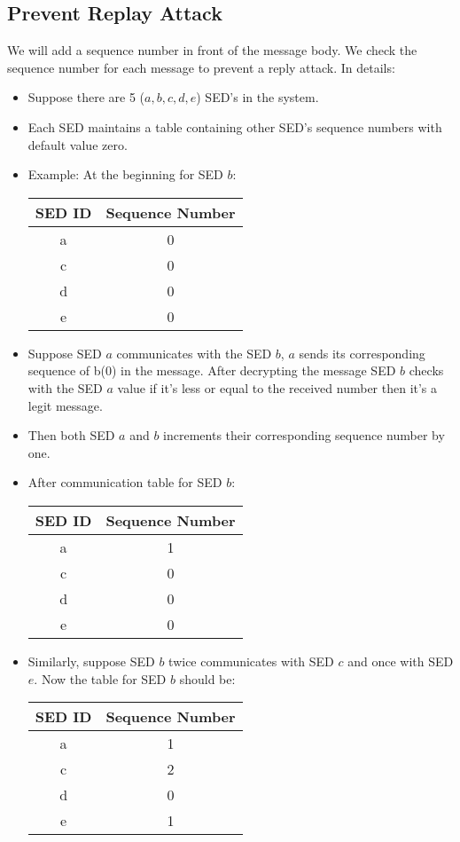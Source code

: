 \documentclass[11pt,oneside,onecolumn,letterpaper]{article}
\begin{document}
  \subsection{Prevent Replay Attack}
  We will add a sequence number in front of the message body. We check the sequence number for each message to prevent a reply attack.
  In details:
  \begin{itemize}
  \item Suppose there are 5 ($a, b, c, d, e$) SED's in the system.
  \item Each SED maintains a table containing other SED's sequence numbers with default value zero.
  \item  Example: At the beginning for SED $b$:

    \begin{center}
  \begin{tabular}{ |c|c| } 
   \hline
  \textbf{SED ID} & \textbf{Sequence Number} \\
 	\hline \hline
 	a & 0 \\ 
	c & 0  \\ 
 	d & 0 \\ 
 	e & 0 \\ 
	 \hline
\end{tabular}
\end{center}
  \item Suppose SED $a$ communicates with the SED $b$, $a$ sends its corresponding sequence of b($0$) in the message. After decrypting the message SED $b$ checks with the SED $a$ value if it's less or equal to the received number then it's a legit message. 
  \item Then both SED $a$ and $b$ increments their corresponding sequence number by one.
  \item After communication table for SED $b$:
    \begin{center}
  \begin{tabular}{ |c|c| } 
   \hline
  \textbf{SED ID} & \textbf{Sequence Number} \\
 	\hline \hline
 	a & 1 \\ 
	c & 0  \\ 
 	d & 0 \\ 
 	e & 0 \\ 
	 \hline
\end{tabular}
\end{center}
\item Similarly, suppose SED $b$ twice communicates with SED $c$ and once with SED $e$. Now the table for SED $b$ should be:
   \begin{center}
  \begin{tabular}{ |c|c| } 
   \hline
  \textbf{SED ID} & \textbf{Sequence Number} \\
 	\hline \hline
 	a & 1 \\ 
	c & 2  \\ 
 	d & 0 \\ 
 	e & 1 \\ 
	 \hline
\end{tabular}
\end{center}
    \end{itemize}
\end{document}
